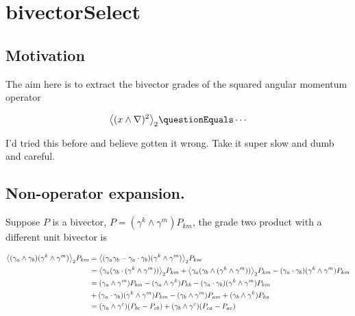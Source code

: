 

\chapter{bivectorSelect}
\label{chap:bivectorSelect}
{}
\date{Sept 6, 2009}

\beginArtNoToc

\section{Motivation}

The aim here is to extract the bivector grades of the squared angular momentum operator

\begin{align}\label{eqn:bivectorSelect:goo1}
\gpgradetwo{ (x \wedge \grad)^2 } \questionEquals \cdots
\end{align}

I'd tried this before and believe gotten it wrong.  Take it super slow and dumb and careful.

\section{Non-operator expansion.}

Suppose $P$ is a bivector, $P = (\gamma^k \wedge \gamma^m) P_{km}$, the grade two product with a different unit bivector is

\begin{align*}
{\left\langle{{ (\gamma_a \wedge \gamma_b) (\gamma^k \wedge \gamma^m) }}\right\rangle}_{2} P_{km} 
&= 
{\left\langle{{ (\gamma_a \gamma_b - \gamma_a \cdot \gamma_b) (\gamma^k \wedge \gamma^m) }}\right\rangle}_{2} P_{km} \\
&= 
{\left\langle{{ \gamma_a (\gamma_b \cdot (\gamma^k \wedge \gamma^m)) }}\right\rangle}_{2} P_{km} 
+ {\left\langle{{ \gamma_a (\gamma_b \wedge (\gamma^k \wedge \gamma^m)) }}\right\rangle}_{2} P_{km} 
- (\gamma_a \cdot \gamma_b) (\gamma^k \wedge \gamma^m) P_{km} \\
&= 
(\gamma_a \wedge \gamma^m) P_{b m} -(\gamma_a \wedge \gamma^k) P_{k b} - (\gamma_a \cdot \gamma_b) (\gamma^k \wedge \gamma^m) P_{km} \\
&+ (\gamma_a \cdot \gamma_b) (\gamma^k \wedge \gamma^m) P_{km} 
- (\gamma_b \wedge \gamma^m) P_{a m} 
+ (\gamma_b \wedge \gamma^k) P_{k a} 
\\
&= 
(\gamma_a \wedge \gamma^c) (P_{b c} -P_{c b})
+ (\gamma_b \wedge \gamma^c) (P_{c a} -P_{a c} )
\\
\end{align*}

